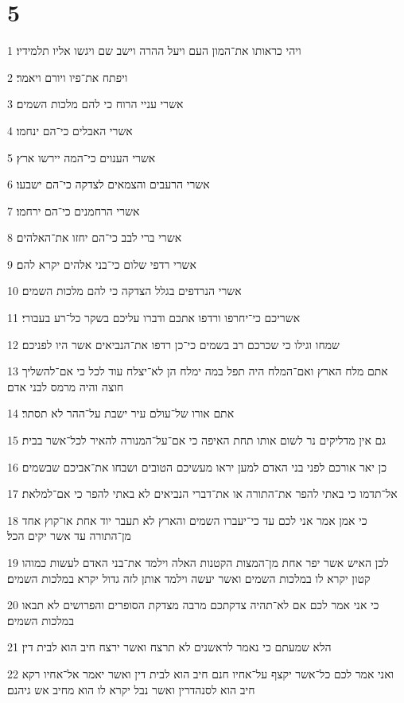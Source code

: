 \chapter{5}

\par 1 ויהי כראותו את־המון העם ויעל ההרה וישב שם ויגשו אליו תלמידיו׃
\par 2 ויפתח את־פיו ויורם ויאמר׃
\par 3 אשרי עניי הרוח כי להם מלכות השמים׃
\par 4 אשרי האבלים כי־הם ינחמו׃
\par 5 אשרי הענוים כי־המה יירשו ארץ׃
\par 6 אשרי הרעבים והצמאים לצדקה כי־הם ישבעו׃
\par 7 אשרי הרחמנים כי־הם ירחמו׃
\par 8 אשרי ברי לבב כי־הם יחזו את־האלהים׃
\par 9 אשרי רדפי שלום כי־בני אלהים יקרא להם׃
\par 10 אשרי הנרדפים בגלל הצדקה כי להם מלכות השמים׃
\par 11 אשריכם כי־יחרפו ורדפו אתכם ודברו עליכם בשקר כל־רע בעבורי׃
\par 12 שמחו וגילו כי שכרכם רב בשמים כי־כן רדפו את־הנביאים אשר היו לפניכם׃
\par 13 אתם מלח הארץ ואם־המלח היה תפל במה ימלח הן לא־יצלח עוד לכל כי אם־להשליך חוצה והיה מרמס לבני אדם׃
\par 14 אתם אורו של־עולם עיר ישבת על־ההר לא תסתר׃
\par 15 גם אין מדליקים נר לשום אותו תחת האיפה כי אם־על־המנורה להאיר לכל־אשר בבית׃
\par 16 כן יאר אורכם לפני בני האדם למען יראו מעשיכם הטובים ושבחו את־אביכם שבשמים׃
\par 17 אל־תדמו כי באתי להפר את־התורה או את־דברי הנביאים לא באתי להפר כי אם־למלאת׃
\par 18 כי אמן אמר אני לכם עד כי־יעברו השמים והארץ לא תעבר יוד אחת או־קוץ אחד מן־התורה עד אשר יקים הכל׃
\par 19 לכן האיש אשר יפר אחת מן־המצות הקטנות האלה וילמד את־בני האדם לעשות כמוהו קטון יקרא לו במלכות השמים ואשר יעשה וילמד אותן לזה גדול יקרא במלכות השמים׃
\par 20 כי אני אמר לכם אם לא־תהיה צדקתכם מרבה מצדקת הסופרים והפרושים לא תבאו במלכות השמים׃
\par 21 הלא שמעתם כי נאמר לראשנים לא תרצח ואשר ירצח חיב הוא לבית דין׃
\par 22 ואני אמר לכם כל־אשר יקצף על־אחיו חנם חיב הוא לבית דין ואשר יאמר אל־אחיו רקא חיב הוא לסנהדרין ואשר נבל יקרא לו הוא מחיב אש גיהנם׃
